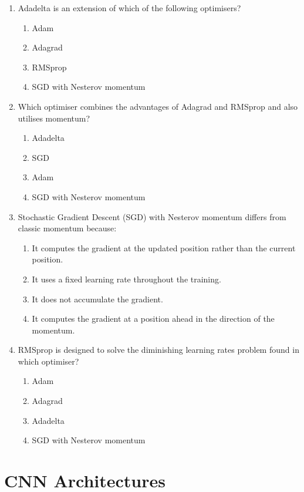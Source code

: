 \documentclass{report}
\numberwithin{equation}{section}
\begin{document}
\begin{enumerate}
\item Adadelta is an extension of which of the following optimisers?
\begin{enumerate}[label=\alph*.]
\item Adam
\item Adagrad
\item RMSprop
\item SGD with Nesterov momentum
\end{enumerate}

\item Which optimiser combines the advantages of Adagrad and RMSprop and also utilises momentum?
\begin{enumerate}[label=\alph*.]
\item Adadelta
\item SGD
\item Adam
\item SGD with Nesterov momentum
\end{enumerate}

\item Stochastic Gradient Descent (SGD) with Nesterov momentum differs from classic momentum because:
\begin{enumerate}[label=\alph*.]
\item It computes the gradient at the updated position rather than the current position.
\item It uses a fixed learning rate throughout the training.
\item It does not accumulate the gradient.
\item It computes the gradient at a position ahead in the direction of the momentum.
\end{enumerate}

\item RMSprop is designed to solve the diminishing learning rates problem found in which optimiser?
\begin{enumerate}[label=\alph*.]
\item Adam
\item Adagrad
\item Adadelta
\item SGD with Nesterov momentum
\end{enumerate}
\end{enumerate}

\section{CNN Architectures}
\end{document}
